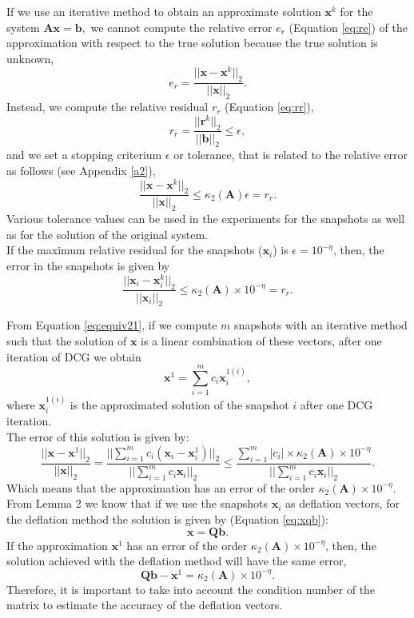 \documentclass[12pt]{article}
\begin{document}
If we use an iterative method to obtain an approximate solution $\mathbf{x}^k$ for the system $\mathbf{A}\mathbf{x}=\mathbf{b},$ we cannot compute the relative error $e_r$ (Equation \eqref{eq:re}) of the approximation with respect to the true solution because the true solution is unknown, 
\begin{equation}\label{eq:re}
 e_r=\frac{||\mathbf{x}-\mathbf{x}^k||_2}{||\mathbf{x}||_2}.
\end{equation}
Instead, we compute the relative residual $r_r$ (Equation \eqref{eq:rr}), 
\begin{equation}\label{eq:rr}
r_r= \frac{||\mathbf{r}^k||_2}{||\mathbf{b}||_2}\leq \epsilon,
\end{equation}
and we set a stopping criterium $\epsilon$ or tolerance, that is related to the relative error as follows \cite{Saad03} (see Appendix \ref{a2}),
$$\frac{||\mathbf{x}-\mathbf{x}^k||_2}{||\mathbf{x}||_2}\leq \kappa_2(\mathbf{A}) \epsilon=r_r.$$
Various tolerance values can be used in the experiments for the snapshots as well as for the solution of the original system. \\
If the maximum relative residual for the snapshots ($\mathbf{x}_i$) is $\epsilon=10^{-\eta}$, then, the error in the snapshots is given by
$$\frac{||\mathbf{x}_i-\mathbf{x}_i^k||_2}{||\mathbf{x}_i||_2}\leq \kappa_2(\mathbf{A})\times 10^{-\eta}=r_r.$$

From Equation \eqref{eq:equiv21}, if we compute $m$ snapshots with an iterative method such that the solution of $\mathbf{x}$ is a linear combination of these vectors, after one iteration of DCG we obtain
$$\mathbf{x}^{1}=\sum_{i=1}^m {c}_i\mathbf{x}_i^{1(i)},$$
where $\mathbf{x}_i^{1(i)}$ is the approximated solution of the snapshot $i$ after one DCG iteration.\\ 
The error of this solution is given by:
$$\frac{||\mathbf{x}-\mathbf{x}^1||_2}{||\mathbf{x}||_2}=
\frac{||\sum_{i=1}^m {c}_i(\mathbf{x}_i-\mathbf{x}_i^{1})||_2}{||\sum_{i=1}^m {c}_i\mathbf{x}_i||_2}\leq
\frac{\sum_{i=1}^m| {c}_i|\times \kappa_2(\mathbf{A})\times 10^{-\eta}}{||\sum_{i=1}^m {c}_i\mathbf{x}_i||_2}.
$$
Which means that the approximation has an error of the order $\kappa_2(\mathbf{A})\times10^{-\eta}.$
\\From Lemma 2 we know that if we use the snapshots $\mathbf{x}_i$ as deflation vectors, for the deflation method the solution is given by (Equation \eqref{eq:xqb}): $$\mathbf{x}=\mathbf{Q}\mathbf{b}.$$ 
If the approximation $\mathbf{x}^1$ has an error of the order $\kappa_2(\mathbf{A})\times10^{-\eta}$, then, the solution achieved with the deflation method will have the same error, 
$$\mathbf{Q}\mathbf{b}-\mathbf{x}^1=\kappa_2(\mathbf{A})\times10^{-\eta}.$$
Therefore, it is important to take into account the condition number of the matrix to estimate the accuracy of the deflation vectors.
\end{document}
